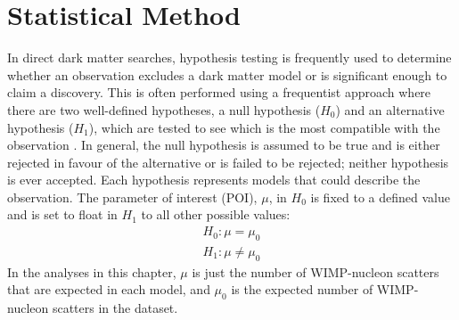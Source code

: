 \section{Statistical Method}

\par
In direct dark matter searches, hypothesis testing is frequently used to determine whether an observation excludes a dark matter model or is significant enough to claim a discovery.
This is often performed using a frequentist approach where there are two well-defined hypotheses, a null hypothesis ($H_0$) and an alternative hypothesis ($H_1$), which are tested to see which is the most compatible with the observation \cite{likelihood_testing_ref}.
In general, the null hypothesis is assumed to be true and is either rejected in favour of the alternative or is failed to be rejected; neither hypothesis is ever accepted.
Each hypothesis represents models that could describe the observation.
The parameter of interest (POI), $\mu$, in $H_0$ is fixed to a defined value and is set to float in $H_1$ to all other possible values:
\begin{equation}
    \begin{split}
        H_0: \mu = \mu_0 \\
        H_1: \mu \neq \mu_0
    \end{split}
\end{equation}
In the analyses in this chapter, $\mu$ is just the number of WIMP-nucleon scatters that are expected in each model, and $\mu_0$ is the expected number of WIMP-nucleon scatters in the dataset.

